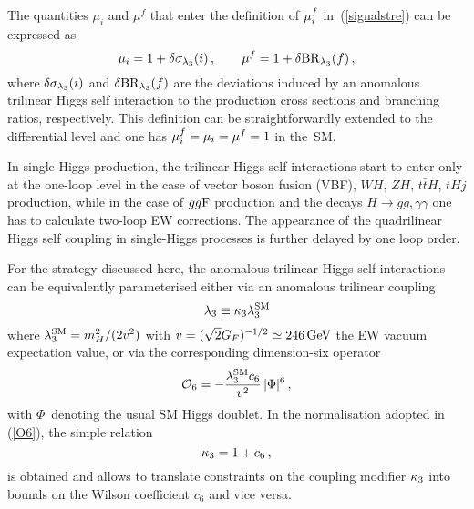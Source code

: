 The quantities $\mu_i$ and $\mu^f$ that enter the definition of  $\mu_i^f$ in~(\ref{signalstre})  can be expressed as
\begin{equation} \label{eq:muf}
\mu_i = 1 + \delta \sigma_{\lambda_{3}}(i) \,,  \qquad 
\mu^f = 1 + \delta {\rm BR}_{\lambda_{3}}(f) \,,
\end{equation}
where $\delta \sigma_{\lambda_{3}}(i)$ and $\delta {\rm BR}_{\lambda_{3}}(f)$ are the deviations induced by an anomalous trilinear Higgs self interaction to the production cross sections and branching ratios, respectively.
This definition can be straightforwardly extended to the differential level and one has $\mu_i^f=\mu_i=\mu^f=1$ in the~SM.

In single-Higgs production, the trilinear Higgs self interactions start to enter only at the one-loop level in the case of vector boson fusion (VBF), $WH$, $ZH$, $t \bar tH$, $tHj$ production, while in the case of $gg{\rm F}$ production and the decays $H\to gg, \gamma \gamma$ one has to calculate two-loop EW corrections. The appearance of the quadrilinear Higgs self coupling in single-Higgs processes is further delayed by one loop order.

For the strategy discussed here, the anomalous trilinear Higgs self interactions can be equivalently parameterised either via an anomalous trilinear coupling  
\begin{equation}
\lambda_{3} \equiv \kappa_{3} \lambda_{3}^{\rm SM}
\end{equation}
where $\lambda_3^{\rm SM} = m_H^2/(2 v^2)$ with $v = (\sqrt{2} G_F)^{-1/2} \simeq 246 \, {\rm GeV}$ the EW vacuum expectation value, or via the corresponding dimension-six operator 
\begin{equation} \label{O6}
{\cal O}_6 = - \frac{\lambda_3^{\rm SM} c_6}{v^2} \, |\Phi|^6  \,,
\end{equation}
with $\Phi$~denoting the usual SM Higgs doublet. In the normalisation adopted in (\ref{O6}), the simple relation 
\begin{equation}
\kappa_{3} = 1 + c_6 \,,
\end{equation}
is obtained and allows to translate constraints on the coupling modifier $\kappa_{3}$ into bounds on the Wilson coefficient $c_6$ and vice versa. 

